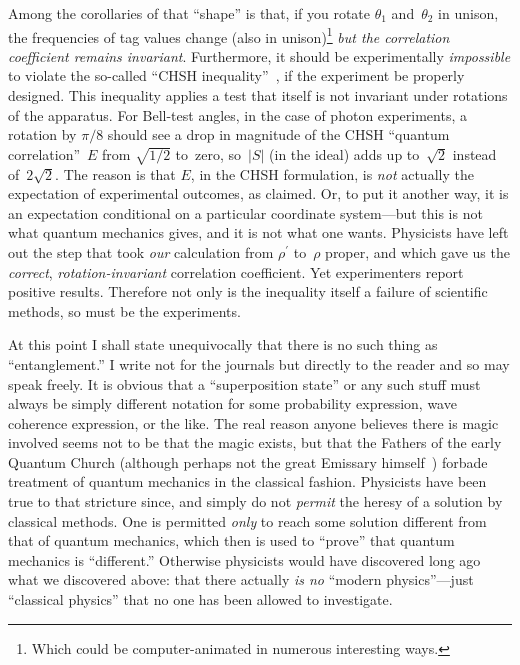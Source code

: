 \documentclass[9pt,technote]{IEEEtran}
\begin{document}
Among the corollaries of that ``shape'' is that, if you rotate
$\theta_1$ and~$\theta_2$ in unison, the frequencies of tag values
change (also in unison)\footnote{Which could be computer-animated in
  numerous interesting ways.} {\em{but the correlation coefficient
    remains invariant}}. Furthermore, it should be experimentally
{\em{impossible}} to violate the so-called ``CHSH
inequality''~\cite{enwiki:1170465048}, if the experiment be properly
designed. This inequality applies a test that itself is not invariant
under rotations of the apparatus. For Bell-test angles, in the case of
photon experiments, a rotation by $\pi\!/8$ should see a drop in
magnitude of the CHSH ``quantum correlation''~$E$ from $\sqrt{1\!/2}$
to~zero, so~$|S|$ (in the ideal) adds up to~$\sqrt2$ instead
of~$2\sqrt2$. The reason is that $E$, in the CHSH formulation, is
{\em{not}} actually the expectation of experimental outcomes, as
claimed. Or, to put it another way, it is an expectation conditional
on a particular coordinate system---but this is not what quantum
mechanics gives, and it is not what one wants. Physicists have left
out the step that took {\em{our}} calculation from $\rho^{\prime}$
to~$\rho$ proper, and which gave us the {\em{correct}},
{\em{rotation-invariant}} correlation coefficient. Yet experimenters
report positive results. Therefore not only is the inequality itself a
failure of scientific methods, so must be the experiments.

At this point I shall state unequivocally that there is no such thing
as ``entanglement.'' I write not for the journals but directly to the
reader and so may speak freely. It is obvious that a ``superposition
state'' or any such stuff must always be simply different notation for
some probability expression, wave coherence expression, or the
like. The real reason anyone believes there is magic involved seems
not to be that the magic exists, but that the Fathers of the early
Quantum Church (although perhaps not the great Emissary
himself~\cite{enwiki:1174555777}) forbade treatment of quantum
mechanics in the classical fashion. Physicists have been true to that
stricture since, and simply do not {\em{permit}} the heresy of a
solution by classical methods. One is permitted {\em{only}} to reach
some solution different from that of quantum mechanics, which then is
used to ``prove'' that quantum mechanics is ``different.'' Otherwise
physicists would have discovered long ago what we discovered above:
that there actually {\em{is no}} ``modern physics''---just ``classical
physics'' that no one has been allowed to investigate.
\end{document}

